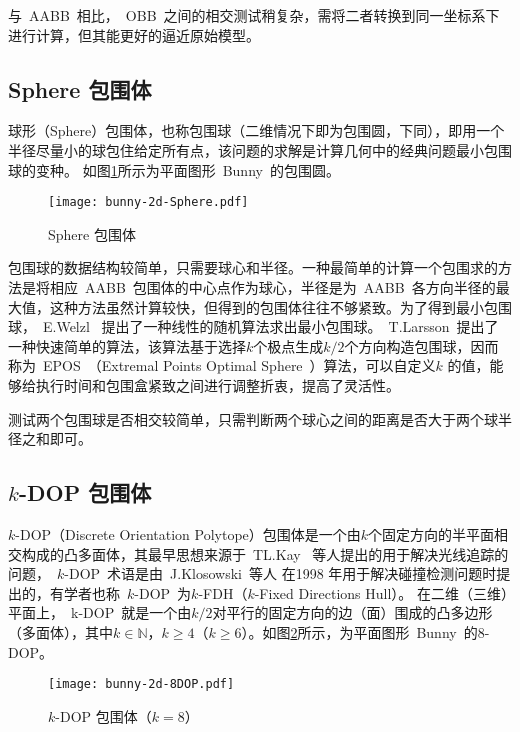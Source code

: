 与~AABB~相比，~OBB~之间的相交测试稍复杂，需将二者转换到同一坐标系下进行计算，但其能更好的逼近原始模型。

\subsection{Sphere 包围体}

球形（Sphere）包围体，也称包围球（二维情况下即为包围圆，下同），即用一个半径尽量小的球包住给定所有点，该问题的求解是计算几何中的经典问题最小包围球的变种。
如图\ref{fig:sphere-bunny}所示为平面图形~Bunny~的包围圆。

\begin{figure}[H] %
  \centering
  \texttt{[image: bunny-2d-Sphere.pdf]}
  \caption{Sphere 包围体}
  \label{fig:sphere-bunny}
\end{figure}

包围球的数据结构较简单，只需要球心和半径。一种最简单的计算一个包围求的方法是将相应~AABB~包围体的中心点作为球心，半径是为~AABB~各方向半径的最大值，这种方法虽然计算较快，但得到的包围体往往不够紧致。为了得到最小包围球，~E.Welzl~\cite{Welzl1991Smallest}
提出了一种线性的随机算法求出最小包围球。~T.Larsson~\cite{larsson2008fast}提出了一种快速简单的算法，该算法基于选择$k$个极点生成$k/2$个方向构造包围球，因而称为~EPOS~（Extremal Points Optimal Sphere~）算法，可以自定义$k$ 的值，能够给执行时间和包围盒紧致之间进行调整折衷，提高了灵活性。

测试两个包围球是否相交较简单，只需判断两个球心之间的距离是否大于两个球半径之和即可。

\subsection{$k$-DOP 包围体}

$k$-DOP（Discrete Orientation Polytope）包围体是一个由$k$个固定方向的半平面相交构成的凸多面体，其最早思想来源于~TL.Kay~\cite{Kay1986Ray}
等人提出的用于解决光线追踪的问题，~$k$-DOP~术语是由~J.Klosowski~等人\cite{klosowski1998efficient}
在1998 年用于解决碰撞检测问题时提出的，有学者也称~$k$-DOP~为$k$-FDH（$k$-Fixed
Directions Hull）\cite{weiyingmei2001}。
在二维（三维）平面上，~k-DOP~就是一个由$k/2$对平行的固定方向的边（面）围成的凸多边形（多面体），其中$k\in\mathbb{N}$，$k\geq4$（$k\geq6$）。如图\ref{fig:8dop-bunny}所示，为平面图形~Bunny~的$8$-DOP。

\begin{figure}[H] %
  \centering
  \texttt{[image: bunny-2d-8DOP.pdf]}
  \caption{$k$-DOP 包围体（$k=8$）}
  \label{fig:8dop-bunny}
\end{figure}

